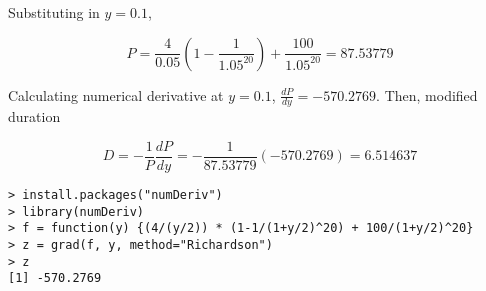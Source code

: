 \documentclass[11pt]{scrartcl}
\begin{document}
Substituting in $y = 0.1$, 

\[P = \frac{4}{0.05} \left( 1 - \frac{1}{1.05^{20}}\right) + \frac{100}{1.05^{20}} = 87.53779\]

Calculating numerical derivative at $y = 0.1$, $\frac{d P}{d y} = -570.2769$. Then, modified duration

\[D = - \frac{1}{P}\frac{dP}{dy} = - \frac{1}{87.53779}(-570.2769) = 6.514637\]

\begin{lstlisting}
> install.packages("numDeriv")
> library(numDeriv)
> f = function(y) {(4/(y/2)) * (1-1/(1+y/2)^20) + 100/(1+y/2)^20}
> z = grad(f, y, method="Richardson")
> z
[1] -570.2769
\end{lstlisting}
\end{document}
